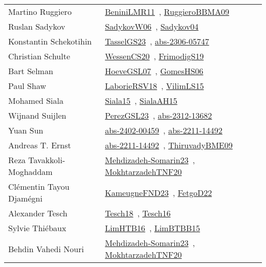 {\begin{longtable}{p{4cm}p{20cm}}
Martino Ruggiero & \href{works/BeniniLMR11.pdf}{BeniniLMR11}~\cite{BeniniLMR11}, \href{works/RuggieroBBMA09.pdf}{RuggieroBBMA09}~\cite{RuggieroBBMA09}\\
Ruslan Sadykov & \href{}{SadykovW06}~\cite{SadykovW06}, \href{works/Sadykov04.pdf}{Sadykov04}~\cite{Sadykov04}\\
Konstantin Schekotihin & \href{works/TasselGS23.pdf}{TasselGS23}~\cite{TasselGS23}, \href{works/abs-2306-05747.pdf}{abs-2306-05747}~\cite{abs-2306-05747}\\
Christian Schulte & \href{works/WessenCS20.pdf}{WessenCS20}~\cite{WessenCS20}, \href{works/FrimodigS19.pdf}{FrimodigS19}~\cite{FrimodigS19}\\
Bart Selman & \href{works/HoeveGSL07.pdf}{HoeveGSL07}~\cite{HoeveGSL07}, \href{works/GomesHS06.pdf}{GomesHS06}~\cite{GomesHS06}\\
Paul Shaw & \href{works/LaborieRSV18.pdf}{LaborieRSV18}~\cite{LaborieRSV18}, \href{works/VilimLS15.pdf}{VilimLS15}~\cite{VilimLS15}\\
Mohamed Siala & \href{works/Siala15.pdf}{Siala15}~\cite{Siala15}, \href{works/SialaAH15.pdf}{SialaAH15}~\cite{SialaAH15}\\
Wijnand Suijlen & \href{works/PerezGSL23.pdf}{PerezGSL23}~\cite{PerezGSL23}, \href{works/abs-2312-13682.pdf}{abs-2312-13682}~\cite{abs-2312-13682}\\
Yuan Sun & \href{works/abs-2402-00459.pdf}{abs-2402-00459}~\cite{abs-2402-00459}, \href{works/abs-2211-14492.pdf}{abs-2211-14492}~\cite{abs-2211-14492}\\
Andreas T. Ernst & \href{works/abs-2211-14492.pdf}{abs-2211-14492}~\cite{abs-2211-14492}, \href{works/ThiruvadyBME09.pdf}{ThiruvadyBME09}~\cite{ThiruvadyBME09}\\
Reza Tavakkoli{-}Moghaddam & \href{works/Mehdizadeh-Somarin23.pdf}{Mehdizadeh-Somarin23}~\cite{Mehdizadeh-Somarin23}, \href{}{MokhtarzadehTNF20}~\cite{MokhtarzadehTNF20}\\
Cl{\'{e}}mentin Tayou Djam{\'{e}}gni & \href{works/KameugneFND23.pdf}{KameugneFND23}~\cite{KameugneFND23}, \href{works/FetgoD22.pdf}{FetgoD22}~\cite{FetgoD22}\\
Alexander Tesch & \href{works/Tesch18.pdf}{Tesch18}~\cite{Tesch18}, \href{works/Tesch16.pdf}{Tesch16}~\cite{Tesch16}\\
Sylvie Thi{\'{e}}baux & \href{works/LimHTB16.pdf}{LimHTB16}~\cite{LimHTB16}, \href{works/LimBTBB15.pdf}{LimBTBB15}~\cite{LimBTBB15}\\
Behdin Vahedi Nouri & \href{works/Mehdizadeh-Somarin23.pdf}{Mehdizadeh-Somarin23}~\cite{Mehdizadeh-Somarin23}, \href{}{MokhtarzadehTNF20}~\cite{MokhtarzadehTNF20}\\

\end{longtable}}

